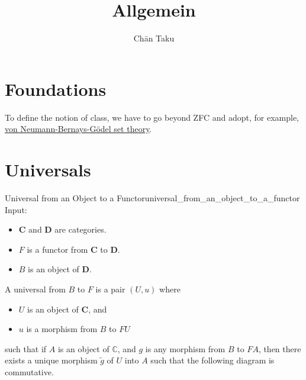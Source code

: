 \documentclass{article}
\title{Allgemein}
\author{Ch\=an Taku}
\begin{document}
\maketitle

\section{Foundations}

To define the notion of class, we have to go beyond ZFC and adopt, for example, \href{https://en.wikipedia.org/wiki/Von_Neumann%E2%80%93Bernays%E2%80%93G%C3%B6del_set_theory}{von Neumann-Bernays-G\"odel set theory}.

\section{Universals}

\begin{definition}{Universal from an Object to a Functor}{universal_from_an_object_to_a_functor}
    Input:
    \begin{itemize}
        \item $\mathbf{C}$ and $\mathbf{D}$ are categories.
        \item $F$ is a functor from $\mathbf{C}$ to $\mathbf{D}$.
        \item $B$ is an object of $\mathbf{D}$.
    \end{itemize}
    A universal from $B$ to $F$ is a pair $(U,u)$ where
    \begin{itemize}
        \item $U$ is an object of $\mathbf{C}$, and
        \item $u$ is a morphism from $B$ to $FU$
    \end{itemize}
    such that if $A$ is an object of $\mathbb{C}$,
    and $g$ is any morphism from $B$ to $FA$,
    then there exists a unique morphism $\tilde{g}$ of $U$ into $A$
    such that the following diagram is commutative.
    \begin{center}
    \end{center}
\end{definition}
\end{document}
